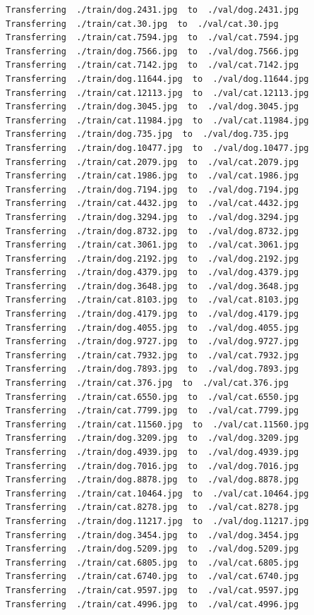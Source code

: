 \documentclass[]{book}
\theoremstyle{definition}
\theoremstyle{definition}
\theoremstyle{definition}
\theoremstyle{remark}
\begin{document}
\begin{verbatim}
Transferring  ./train/dog.2431.jpg  to  ./val/dog.2431.jpg
Transferring  ./train/cat.30.jpg  to  ./val/cat.30.jpg
Transferring  ./train/cat.7594.jpg  to  ./val/cat.7594.jpg
Transferring  ./train/dog.7566.jpg  to  ./val/dog.7566.jpg
Transferring  ./train/cat.7142.jpg  to  ./val/cat.7142.jpg
Transferring  ./train/dog.11644.jpg  to  ./val/dog.11644.jpg
Transferring  ./train/cat.12113.jpg  to  ./val/cat.12113.jpg
Transferring  ./train/dog.3045.jpg  to  ./val/dog.3045.jpg
Transferring  ./train/cat.11984.jpg  to  ./val/cat.11984.jpg
Transferring  ./train/dog.735.jpg  to  ./val/dog.735.jpg
Transferring  ./train/dog.10477.jpg  to  ./val/dog.10477.jpg
Transferring  ./train/cat.2079.jpg  to  ./val/cat.2079.jpg
Transferring  ./train/cat.1986.jpg  to  ./val/cat.1986.jpg
Transferring  ./train/dog.7194.jpg  to  ./val/dog.7194.jpg
Transferring  ./train/cat.4432.jpg  to  ./val/cat.4432.jpg
Transferring  ./train/dog.3294.jpg  to  ./val/dog.3294.jpg
Transferring  ./train/dog.8732.jpg  to  ./val/dog.8732.jpg
Transferring  ./train/cat.3061.jpg  to  ./val/cat.3061.jpg
Transferring  ./train/dog.2192.jpg  to  ./val/dog.2192.jpg
Transferring  ./train/dog.4379.jpg  to  ./val/dog.4379.jpg
Transferring  ./train/dog.3648.jpg  to  ./val/dog.3648.jpg
Transferring  ./train/cat.8103.jpg  to  ./val/cat.8103.jpg
Transferring  ./train/dog.4179.jpg  to  ./val/dog.4179.jpg
Transferring  ./train/dog.4055.jpg  to  ./val/dog.4055.jpg
Transferring  ./train/dog.9727.jpg  to  ./val/dog.9727.jpg
Transferring  ./train/cat.7932.jpg  to  ./val/cat.7932.jpg
Transferring  ./train/dog.7893.jpg  to  ./val/dog.7893.jpg
Transferring  ./train/cat.376.jpg  to  ./val/cat.376.jpg
Transferring  ./train/cat.6550.jpg  to  ./val/cat.6550.jpg
Transferring  ./train/cat.7799.jpg  to  ./val/cat.7799.jpg
Transferring  ./train/cat.11560.jpg  to  ./val/cat.11560.jpg
Transferring  ./train/dog.3209.jpg  to  ./val/dog.3209.jpg
Transferring  ./train/dog.4939.jpg  to  ./val/dog.4939.jpg
Transferring  ./train/dog.7016.jpg  to  ./val/dog.7016.jpg
Transferring  ./train/dog.8878.jpg  to  ./val/dog.8878.jpg
Transferring  ./train/cat.10464.jpg  to  ./val/cat.10464.jpg
Transferring  ./train/cat.8278.jpg  to  ./val/cat.8278.jpg
Transferring  ./train/dog.11217.jpg  to  ./val/dog.11217.jpg
Transferring  ./train/dog.3454.jpg  to  ./val/dog.3454.jpg
Transferring  ./train/dog.5209.jpg  to  ./val/dog.5209.jpg
Transferring  ./train/cat.6805.jpg  to  ./val/cat.6805.jpg
Transferring  ./train/cat.6740.jpg  to  ./val/cat.6740.jpg
Transferring  ./train/cat.9597.jpg  to  ./val/cat.9597.jpg
Transferring  ./train/cat.4996.jpg  to  ./val/cat.4996.jpg

\end{verbatim}
\end{document}
